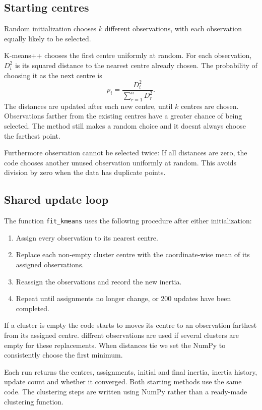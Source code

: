 \documentclass[11pt,a4paper]{article}
\begin{document}
\subsection{Starting centres}

Random initialization chooses $k$ different observations, with each observation equally likely to be selected.

K-means++ chooses the first centre uniformly at random. For each observation, $D_i^2$ is its squared distance to the nearest centre already chosen. The probability of choosing it as the next centre is
\begin{equation}
p_i=\frac{D_i^2}{\sum_{r=1}^{n}D_r^2}.
\label{eq:seeding}
\end{equation}
The distances are updated after each new centre, until $k$ centres are chosen. Observations farther from the existing centres have a greater chance of being selected. The method still makes a random choice and it doesnt always choose the farthest point.

Furthermore observation cannot be selected twice: If all distances are zero, the code chooses another unused observation uniformly at random. This avoids division by zero when the data has duplicate points.

\subsection{Shared update loop}

The function \texttt{fit\_kmeans} uses the following procedure after either initialization:
\begin{enumerate}
\item Assign every observation to its nearest centre.
\item Replace each non-empty cluster centre with the coordinate-wise mean of its assigned observations.
\item Reassign the observations and record the new inertia.
\item Repeat until assignments no longer change, or 200 updates have been completed.
\end{enumerate}

If a cluster is empty the code starts to moves its centre to an observation farthest from its assigned centre. diffrent observations are used if several clusters are empty for these replacements. When distances tie we set the NumPy to consistently choose the first minimum.

Each run returns the centres, assignments, initial and final inertia, inertia history, update count and whether it converged. Both starting methods use the same code. The clustering steps are written using NumPy rather than a ready-made clustering function.
\end{document}
